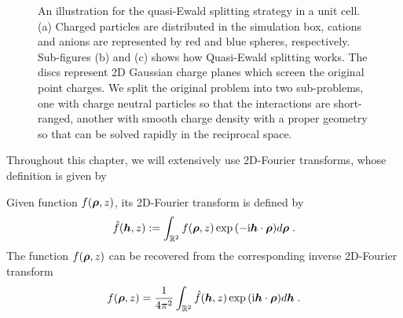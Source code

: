 \begin{figure}
    \caption{
        An illustration for the quasi-Ewald splitting strategy in a unit cell.
        (a) Charged particles are distributed in the simulation box, cations and anions are represented by red and blue spheres, respectively.
        Sub-figures (b) and (c) shows how Quasi-Ewald splitting works. 
        The discs represent 2D Gaussian charge planes which screen the original point charges.
        We split the original problem into two sub-problems, one with charge neutral particles so that the interactions are short-ranged, another with smooth charge density with a proper geometry so that can be solved rapidly in the reciprocal space.
    }
    \label{fig:QuasiEwaldSplitting}
\end{figure}
Throughout this chapter, we will extensively use 2D-Fourier transforms, whose definition is given by
\begin{defn}
    Given function $f(\boldsymbol{\rho}, z)$, its 2D-Fourier transform is defined by
    \begin{equation}
        \Hat{f}(\boldsymbol{h}, z):=\int_{\mathbb{R}^2}f(\boldsymbol{\rho},z)\exp{(-\mathrm{i} \boldsymbol{h} \cdot \boldsymbol{\rho})} d \boldsymbol{\rho} \;.
    \end{equation}
    The function  $f(\boldsymbol{\rho}, z)$ can be  recovered from the corresponding inverse 2D-Fourier transform
    \begin{equation} 
        f(\boldsymbol{\rho}, z)=\frac{1}{4\pi^2}\int_{\mathbb{R}^2}\Hat{f}(\boldsymbol{h}, z)\exp{(\mathrm{i} \boldsymbol{h} \cdot \boldsymbol{\rho})} d \boldsymbol{h} \;.
    \end{equation}
\end{defn} 
